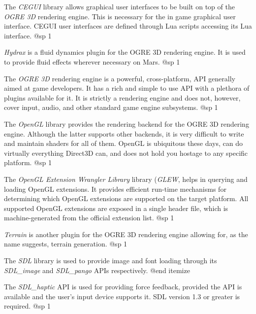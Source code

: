 \item
The {\it CEGUI} library allows graphical user interfaces to be built on top of the {\it OGRE 3D} rendering engine. This is necessary for the in game graphical user interface. CEGUI user interfaces are defined through Lua scripts accessing its Lua interface.
@sp 1

\item
{\it Hydrax} is a fluid dynamics plugin for the OGRE 3D rendering engine. It is used to provide fluid effects wherever necessary on Mars.
@sp 1

\item
The {\it OGRE 3D} rendering engine is a powerful, cross-platform, API generally aimed at game developers. It has a rich and simple to use API with a plethora of plugins available for it. It is strictly a rendering engine and does not, however, cover input, audio, and other standard game engine subsystems.
@sp 1

\item
The {\it OpenGL} library provides the rendering backend for the OGRE 3D rendering engine. Although the latter supports other backends, it is very difficult to write and maintain shaders for all of them. OpenGL is ubiquitous these days, can do virtually everything Direct3D can, and does not hold you hostage to any specific platform.
@sp 1

\item
The {\it OpenGL Extension Wrangler Library} library ({\it GLEW}, helps in querying and loading OpenGL extensions. It provides efficient run-time mechanisms for determining which OpenGL extensions are supported on the target platform. All supported OpenGL extensions are exposed in a single header file, which is machine-generated from the official extension list.
@sp 1

\item
{\it Terrain} is another plugin for the OGRE 3D rendering engine allowing for, as the name suggests, terrain generation.
@sp 1

\item
The {\it SDL} library is used to provide image and font loading through its {\it SDL_image} and {\it SDL_pango} APIs respectively.
@end itemize


\itemize
\item
The {\it SDL_haptic} API is used for providing force feedback, provided the API is available and the user's input device supports it. SDL version 1.3 or greater is required.
@sp 1


